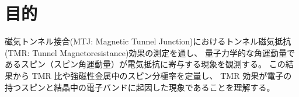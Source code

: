 \documentclass[../../../main]{subfiles}
\begin{document}
\section{目的}
磁気トンネル接合(MTJ: Magnetic Tunnel Junction)におけるトンネル磁気抵抗(TMR: Tunnel Magnetoresistance)効果の測定を通し、
量子力学的な角運動量であるスピン（スピン角運動量）が電気抵抗に寄与する現象を観測する。
この結果から TMR 比や強磁性金属中のスピン分極率を定量し、
TMR 効果が電子の持つスピンと結晶中の電子バンドに起因した現象であることを理解する。
\end{document}
